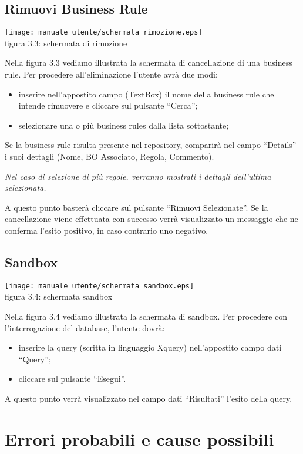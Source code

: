 \subsection{Rimuovi Business Rule}
\begin{center}
\texttt{[image: manuale\_utente/schermata\_rimozione.eps]}\\
 figura 3.3: schermata di rimozione
\end{center}
Nella figura 3.3 vediamo illustrata la schermata di cancellazione di una business rule. Per procedere all'eliminazione l'utente avr\`a due modi:
\begin{itemize}
\item inserire nell'appostito campo (TextBox) il nome della business rule che intende rimuovere e cliccare sul pulsante ``Cerca'';
\item selezionare una o pi\`u business rules dalla lista sottostante;
\end{itemize}
Se la business rule risulta presente nel repository, comparir\`a  nel campo ``Details'' i suoi dettagli (Nome, BO Associato, Regola, Commento). 
\begin{footnotesize}\textit{Nel caso di selezione di pi\`u regole, verranno mostrati i dettagli dell'ultima selezionata.
} \end{footnotesize} A questo punto baster\`a cliccare sul pulsante ``Rimuovi Selezionate''.  Se la cancellazione viene effettuata con successo verr\`a visualizzato un messaggio che ne conferma l'esito positivo, in caso contrario uno negativo.
\subsection{Sandbox}
\begin{center}
 \texttt{[image: manuale\_utente/schermata\_sandbox.eps]} \\
 figura 3.4: schermata sandbox
\end{center}
Nella figura 3.4 vediamo illustrata la schermata di sandbox. Per procedere con l'interrogazione del database, l'utente dovr\`a:
\begin{itemize}
\item inserire la query (scritta in linguaggio Xquery) nell'appostito campo dati ``Query'';
\item cliccare sul pulsante ``Esegui''.
\end{itemize}
A questo punto verr\`a visualizzato nel campo dati ``Risultati'' l'esito della query.
\section{Errori probabili e cause possibili}
